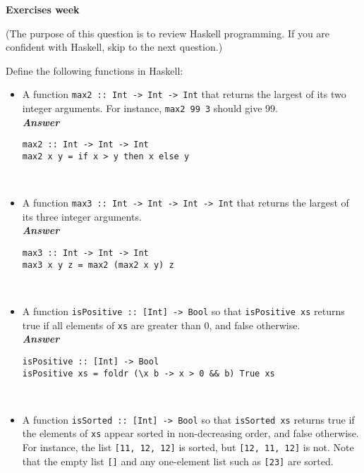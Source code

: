 \documentclass[a4paper]{article}
\begin{document}
\begin{center}
{\Large\bf Exercises week }\vspace{1cm}

\end{center}


\begin{exercise}\label{exer-fsharp-functions}
(The purpose of this question is to review Haskell programming. If you are confident with Haskell, skip to the next question.)

  Define the following functions in Haskell:

\begin{itemize}
\item A function \texttt{max2 ::\ Int -> Int -> Int} that returns the
  largest of its two integer arguments.  For instance, \texttt{max2 99
    3} should give 99.\\
  
\noindent
\textbf{\emph{Answer}}    
{\codesetup\begin{verbatim}
max2 :: Int -> Int -> Int
max2 x y = if x > y then x else y
\end{verbatim}}\\
  
\item A function \texttt{max3 ::\ Int -> Int -> Int -> Int} that returns
  the largest of its three integer arguments.\\
    
\noindent
\textbf{\emph{Answer}}
{\codesetup\begin{verbatim}
max3 :: Int -> Int -> Int
max3 x y z = max2 (max2 x y) z
\end{verbatim}}\\
  
\item A function \texttt{isPositive ::\ [Int] -> Bool} so that
  \texttt{isPositive xs} returns true if all elements of \texttt{xs}
  are greater than 0, and false otherwise.\\
    
\noindent
\textbf{\emph{Answer}}
{\codesetup\begin{verbatim}
isPositive :: [Int] -> Bool
isPositive xs = foldr (\x b -> x > 0 && b) True xs
\end{verbatim}}\\
  
\item A function \texttt{isSorted ::\ [Int] -> Bool} so that
  \texttt{isSorted xs} returns true if the elements of \texttt{xs}
  appear sorted in non-decreasing order, and false otherwise.  For
  instance, the list \texttt{[11, 12, 12]} is sorted, but \texttt{[12,
    11, 12]} is not.  Note that the empty list \texttt{[]} and any
  one-element list such as \texttt{[23]} are sorted.\\
    

\end{itemize}
\end{exercise}
\end{document}
